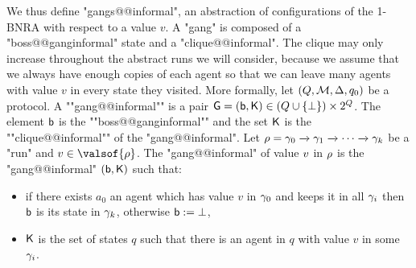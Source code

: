 	We thus define "gangs@@informal", an abstraction of configurations%
	 of the 1-BNRA with respect to a value $v$. A "gang" is composed of a "boss@@ganginformal" state and a "clique@@informal". The clique may only increase throughout the abstract runs we will consider, because we assume that we always have enough copies of each agent so that we can leave many agents with value $v$ in every state they visited.
	\AP More formally, let $(Q,\mathcal{M}, \Delta, q_0)$ be a protocol.
	A ""gang@@informal"" is a pair $\mathsf{G} = (\mathsf{b}, \mathsf{K}) \in (Q \cup \{\bot\}) \times 2^{Q}$. The element $\mathsf{b}$ is the ""boss@@ganginformal"" and the set $\mathsf{K}$ is the ""clique@@informal"" of the "gang@@informal". 	
	Let $\rho = \gamma_0 \xrightarrow{} \gamma_1 \xrightarrow{} \cdots \xrightarrow{} \gamma_k$ be a "run" and $\aval \in \valsof{\run}$. The "gang@@informal" of value $v$ in $\rho$ is the "gang@@informal" $(\mathsf{b}, \mathsf{K})$ such that:
	\begin{itemize}
		\item if there exists $a_0$ an agent which has value $v$ in $\gamma_0$ and keeps it in all $\gamma_i$ then $\mathsf{b}$ is its state in $\gamma_k$, otherwise $\mathsf{b} := \bot$, 
		\item  $\mathsf{K}$ is the set of states $q$ such that there is an agent in $q$ with value $v$ in some $\gamma_i$.
	\end{itemize}
	
  
	

